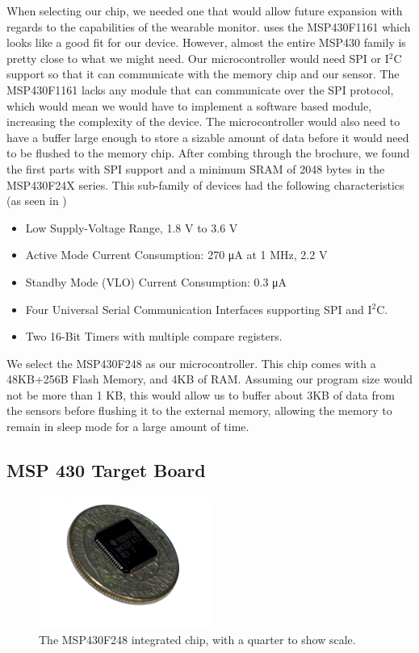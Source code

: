 When selecting our chip,
we needed one that would allow future expansion with regards to the capabilities of the wearable monitor.
\cite{Web:ShimmerHome} uses the MSP430F1161 which looks like a good fit for our device. 
However, almost the entire MSP430 family is pretty close to what we might need.
Our microcontroller would need SPI or I$^2$C support so that it can communicate with the memory chip and our sensor.
The MSP430F1161 lacks any module that can communicate over the SPI protocol,
which would mean we would have to implement a software based module,
increasing the complexity of the device.
The microcontroller would also need to have a buffer large enough to store
a sizable amount of data before it would need to be flushed to the memory chip.
After combing through the brochure, we found the first parts with SPI support and
a minimum SRAM of 2048 bytes in the MSP430F24X series. This sub-family of devices had
the following characteristics (as seen in \cite{msp430F24xfamily})

\begin{itemize}
	\item Low Supply-Voltage Range, 1.8 V to 3.6 V
	\item Active Mode Current Consumption: 270 μA at 1 MHz, 2.2 V
	\item Standby Mode (VLO) Current Consumption: 0.3 μA
	\item Four Universal Serial Communication Interfaces supporting SPI and I$^2$C.
	\item Two 16-Bit Timers with multiple compare registers.
\end{itemize}
We select the MSP430F248 as our microcontroller. This chip comes with a 48KB+256B Flash Memory, and 4KB of RAM. Assuming our program size would not be more than 1 KB, this would allow us to buffer about 3KB of data from the sensors before flushing it to the external memory, allowing the memory to remain in sleep mode for a large amount of time.

\subsection{MSP 430 Target Board}
\label{MSP430Target}

\begin{figure}
\begin{center}
\includegraphics[width=0.5\textwidth]{images/QFPFoot.jpg}
\caption{The MSP430F248 integrated chip, with a quarter to show scale.}
\label{Fig:QFPFoot}
\end{center}
\end{figure}

